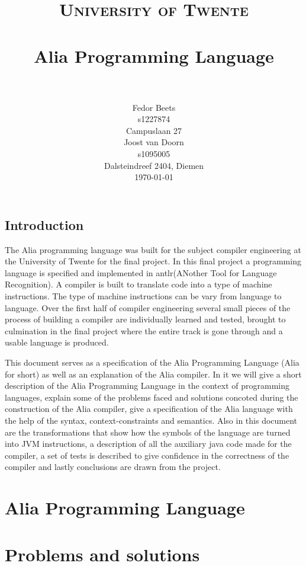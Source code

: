 \documentclass[paper=a4, fontsize=11pt]{report}
\title{
		\usefont{OT1}{bch}{b}{n}
		\normalfont \normalsize \textsc{University of Twente} \\ [25pt]
		\horrule{0.5pt} \\[0.4cm]
		\huge Alia Programming Language \\
		\horrule{2pt} \\[0.5cm]
}
\author{
		\normalfont 								\normalsize
        Fedor Beets\\[-3pt]						\small
        s1227874\\[-3pt]        				\small
        Campuslaan 27\\[8pt]					\normalsize
        Joost van Doorn\\[-3pt]					\small
        s1095005\\[-3pt]						\small
        Dalsteindreef 2404, Diemen\\[8pt]			\normalsize
        \today
}
\date{}
\numberwithin{equation}{section}		%
\numberwithin{figure}{section}			%
\numberwithin{table}{section}				%
\begin{document}
\maketitle
\section*{Introduction}
The Alia programming language was built for the subject compiler engineering at the University of Twente for the final project. In this final project a programming language is specified and implemented in antlr(ANother Tool for Language Recognition). A compiler is built to translate code into a type of machine instructions. The type of machine instructions can be vary from language to language. Over the first half of compiler engineering several small pieces of the process of building a compiler are individually learned and tested, brought to culmination in the final project where the entire track is gone through and a usable language is produced. 

This document serves as a specification of the Alia Programming Language (Alia for short) as well as an explanation of the Alia compiler. In it we will give a short description of the Alia Programming Language in the context of programming languages, explain some of the problems faced and solutions concoted during the construction of the Alia compiler,  give a specification of the Alia language with the help of the syntax, context-constraints and semantics. Also in this document are the transformations that show how the symbols of the language are turned into JVM instructions, a description of all the auxiliary java code made for the compiler, a set of tests is described to give confidence in the correctness of the compiler and lastly conclusions are drawn from the project.

\chapter{Alia Programming Language}


\chapter{Problems and solutions}
\end{document}
